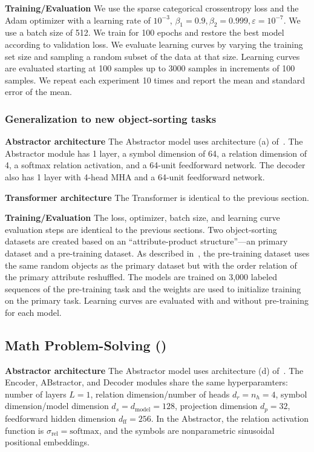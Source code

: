\textbf{Training/Evaluation} We use the sparse categorical crossentropy loss and the Adam optimizer with a learning rate of $10^{-3}$, $\beta_1 = 0.9, \beta_2 = 0.999, \varepsilon = 10^{-7}$. We use a batch size of 512. We train for 100 epochs and restore the best model according to validation loss. We evaluate learning curves by varying the training set size and sampling a random subset of the data at that size. Learning curves are evaluated starting at 100 samples up to 3000 samples in increments of 100 samples. We repeat each experiment 10 times and report the mean and standard error of the mean.

\subsubsection{Generalization to new object-sorting tasks }

\textbf{Abstractor architecture} The Abstractor model uses architecture (a) of~. The Abstractor module has 1 layer, a symbol dimension of 64, a relation dimension of 4, a softmax relation activation, and a 64-unit feedforward network. The decoder also has 1 layer with 4-head MHA and a 64-unit feedforward network.

\textbf{Transformer architecture} The Transformer is identical to the previous section.

\textbf{Training/Evaluation} The loss, optimizer, batch size, and learning curve evaluation steps are identical to the previous sections. Two object-sorting datasets are created based on an ``attribute-product structure''---an primary dataset and a pre-training dataset. As described in~, the pre-training dataset uses the same random objects as the primary dataset but with the order relation of the primary attribute reshuffled. The models are trained on 3,000 labeled sequences of the pre-training task and the weights are used to initialize training on the primary task. Learning curves are evaluated with and without pre-training for each model.

\subsection{Math Problem-Solving ()}

\textbf{Abstractor architecture} The Abstractor model uses architecture (d) of~. The Encoder, ABstractor, and Decoder modules share the same hyperparamters: number of layers $L = 1$, relation dimension/number of heads $d_r = n_h = 4$, symbol dimension/model dimension $d_s = d_{\mathrm{model}} = 128$, projection dimension $d_p = 32$, feedforward hidden dimension $d_{\mathrm{ff}} = 256$. In the Abstractor, the relation activation function is $\sigma_{\mathrm{rel}} = \mathrm{softmax}$, and the symbols are nonparametric sinusoidal positional embeddings.


